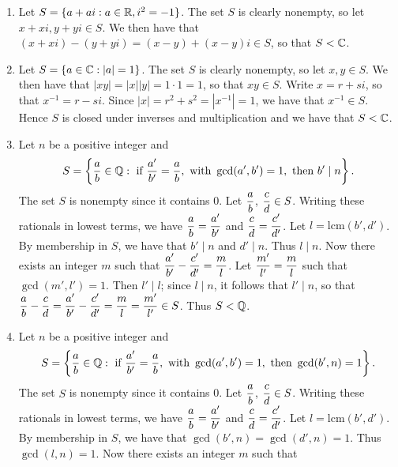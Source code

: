 \begin{enumerate}
      \begin{enumerate}
         \item Let $S = \{a + ai: a \in \mathbb{R}, i^2 = -1\}$. The set $S$ is clearly
               nonempty, so let $x+xi, y+yi \in S$. We then have that
               $(x+xi)-(y+yi) = (x-y) + (x-y)i \in S$, so that $S < \mathbb{C}$.
         \item Let $S = \{a \in \mathbb{C}: |a| = 1\}$. The set $S$ is clearly nonempty,
               so let $x, y \in S$. We then have that
               $|xy| = |x||y| = 1 \cdot 1 = 1$, so that $xy \in S$. Write
               $x = r + si$, so that $x^{-1} = r - si$. Since
               $|x| = r^2 + s^2 = |x^{-1}| = 1$, we have that $x^{-1} \in S$.
               Hence $S$ is closed under inverses and multiplication and we have
               that $S < \mathbb{C}$.
         \item Let $n$ be a positive integer and
               $$S = \left\{\frac{a}{b} \in
               \mathbb{Q} : \text{ if } \frac{a'}{b'} = \frac{a}{b},
               \text{ with }\gcd(a', b') = 1, \text{ then } b' \mid n\right\}.$$ 
               The set $S$ is nonempty since it contains 0. Let $\displaystyle\frac{a}{b}$,
               $\displaystyle\frac{c}{d} \in S$. Writing these rationals in lowest terms,
               we have $\displaystyle\frac{a}{b} = \frac{a'}{b'}$ and
               $\displaystyle\frac{c}{d} = \frac{c'}{d'}$. Let $l = \mbox{lcm}(b', d')$.
               By membership in $S$, we have that $b' \mid n$ and $d' \mid n$. 
               Thus $l \mid n$. Now there exists an integer $m$ such that 
               $\displaystyle\frac{a'}{b'} - \frac{c'}{d'} = \frac{m}{l}$. Let
               $\displaystyle\frac{m'}{l'} = \frac{m}{l}$ such that $\gcd(m', l') = 1$.
               Then $l' \mid l$; since $l \mid n$, it follows that $l' \mid n$,
               so that $\displaystyle\frac{a}{b} - \frac{c}{d} = \displaystyle\frac{a'}{b'} -
               \frac{c'}{d'} = \frac{m}{l} =\frac{m'}{l'} \in S$. Thus $S < \mathbb{Q}$.
         \item Let $n$ be a positive integer and
               $$S = \left\{\frac{a}{b} \in
               \mathbb{Q} : \text{ if } \frac{a'}{b'} = \frac{a}{b},
               \text{ with }\gcd(a',b')=1, \text{ then } \gcd(b',n)=1\right\}.$$ 
               The set $S$ is nonempty since it contains 0. Let $\displaystyle\frac{a}{b}$,
               $\displaystyle\frac{c}{d} \in S$. Writing these rationals in lowest terms,
               we have $\displaystyle\frac{a}{b} = \frac{a'}{b'}$ and
               $\displaystyle\frac{c}{d} = \frac{c'}{d'}$. Let $l = \mbox{lcm}(b', d')$.
               By membership in $S$, we have that $\gcd(b',n) = \gcd(d',n) = 1$. 
               Thus $\gcd(l,n)=1$. Now there exists an integer $m$ such that 

\end{enumerate}
\end{enumerate}
